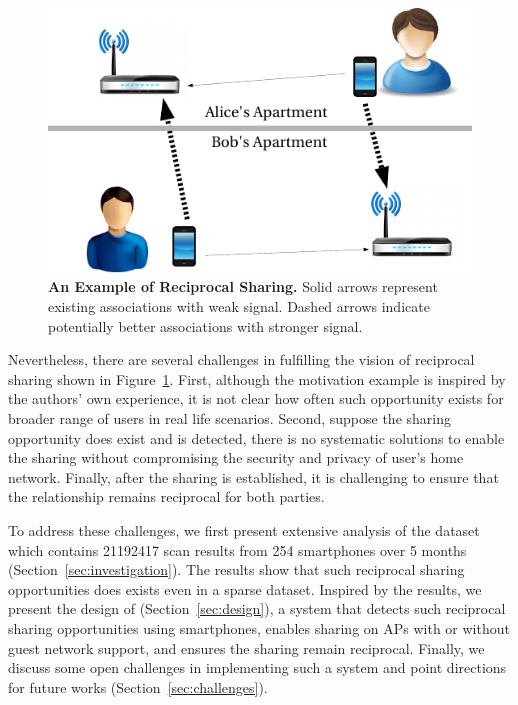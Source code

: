 \begin{figure}[t]
  \centering
  \includegraphics[width=\columnwidth]{./figures/motivation.pdf}
  \caption{\textbf{An Example of Reciprocal \wifi{} Sharing.} Solid arrows
    represent existing associations with weak signal. Dashed arrows indicate
  potentially better associations with stronger \wifi{} signal.}
  \label{fig:motivation}
\end{figure}

Nevertheless, there are several challenges in fulfilling the vision of
reciprocal \wifi{} sharing shown in Figure~\ref{fig:motivation}. First, although
the motivation example is inspired by the authors' own experience, it is not
clear how often such opportunity exists for broader range of users in real life
scenarios. Second, suppose the sharing opportunity does exist and is detected,
there is no systematic solutions to enable the \wifi{} sharing without
compromising the security and privacy of user's home network. Finally, after the
\wifi{} sharing is established, it is challenging to ensure that the
relationship remains reciprocal for both parties.

To address these challenges, we first present extensive analysis of the
\PhoneLab{} \wifi{} dataset which contains \num{21192417} scan results from 254
smartphones over 5 months (Section~\ref{sec:investigation}). The results show
that such reciprocal \wifi{} sharing opportunities does exists even in a sparse
dataset. Inspired by the results, we present the design of \wisefi{}
(Section~\ref{sec:design}), a system that detects such reciprocal \wifi{}
sharing opportunities using smartphones, enables \wifi{} sharing on APs with or
without guest network support, and ensures the sharing remain reciprocal.
Finally, we discuss some open challenges in implementing such a system and point
directions for future works (Section~\ref{sec:challenges}).
